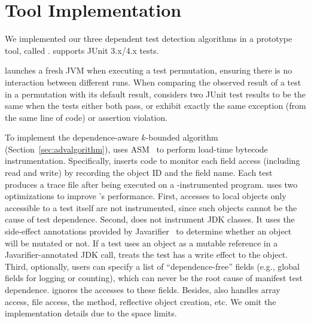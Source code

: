 \section{Tool Implementation}
\label{sec:impl}


We implemented our three dependent test detection algorithms in
a prototype tool, called \ourtool. \ourtool
supports JUnit 3.x/4.x tests. %

\ourtool launches a fresh JVM when
executing a test permutation, ensuring there is no interaction between
different runs. When comparing the observed result of
a test in a permutation with its default result,
\ourtool considers two JUnit test results to be the same when the
tests either both pass, or exhibit exactly the same exception
(from the same line of code) or assertion violation.

 

To implement the dependence-aware $k$-bounded algorithm (Section~\ref{sec:advalgorithm}),
\ourtool uses ASM~\cite{asm} to perform load-time bytecode
instrumentation. Specifically, \ourtool inserts code to monitor each
field access (including read and write) by recording the
object ID and the field name. Each test produces a trace file after being
executed on a \ourtool-instrumented program.
\ourtool uses two optimizations to improve \ourtool's performance.
First, accesses to local objects
only accessible to a test itself are not instrumented,
since such objects cannot
be the cause of test dependence. Second,
\ourtool does not instrument JDK classes. It uses the side-effect
annotations provided by Javarifier~\cite{QuinonezTE2008} to 
determine whether an object will be mutated or not.
If a test uses an object as a mutable reference
in a Javarifier-annotated JDK call, \ourtool treats the test
has a write effect to the object.
Third, optionally, users can specify a list of ``dependence-free''
fields (e.g., global fields for logging or counting), which can
never be the root cause of manifest test dependence. \ourtool
ignores the accesses to these fields.
Besides, \ourtool also handles array access, file access, 
the  method, reflective object creation, etc.
We omit the implementation details due to the space limits.


